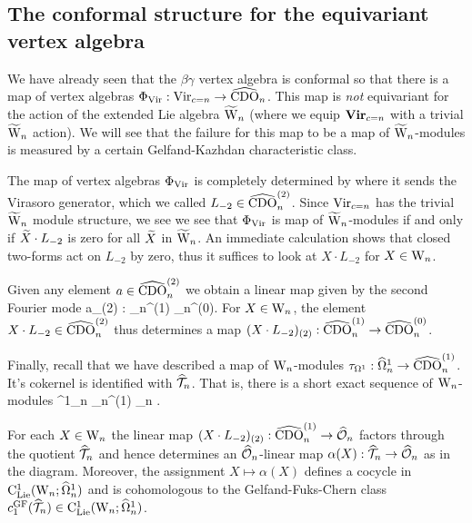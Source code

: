 \subsection{The conformal structure for the equivariant vertex algebra}

We have already seen that the $\beta\gamma$ vertex algebra is
conformal so that there is a map of vertex algebras $\Phi_{\rm Vir} :
{\rm Vir}_{c=n} \to \hCDO_n$. This map is {\em not} equivariant for
the action of the extended Lie algebra $\TVect$ (where we equip ${\bf
  Vir}_{c=n}$ with a trivial $\TVect$ action). We will see that the
failure for this map to be a map of $\TVect$-modules is measured by a
certain Gelfand-Kazhdan characteristic class. 

The map of vertex algebras $\Phi_{\rm Vir}$ is completely determined
by where it sends the Virasoro generator, which we called $L_{-2} \in
\hCDO_n^{(2)}$. Since ${\rm Vir}_{c=n}$ has the trivial $\TVect$
module structure, we see we see that $\Phi_{\rm Vir}$ is map of $\TVect$-modules if and only if $\Tilde{X} \cdot L_{-2}$ is zero for all $\Tilde{X}$ in $\TVect$. An immediate calculation shows that closed two-forms act on $L_{-2}$ by zero, thus it suffices to look at $X \cdot L_{-2}$ for $X \in \Vect$. 

Given any element $a \in \hCDO_n^{(2)}$ we obtain a linear map given
by the second Fourier mode
\ben
a_{(2)} : \hCDO_n^{(1)} \to \hCDO_n^{(0)}. 
\een 
For $X \in \Vect$, the element $X \cdot L_{-2} \in \hCDO_n^{(2)}$ thus determines a map $(X \cdot L_{-2})_{(2)} : \hCDO_n^{(1)} \to \hCDO_n^{(0)}$. 

Finally, recall that we have described a map of $\Vect$-modules $\tau_{\Omega^1} : \hOmega^1_n \to \hCDO_n^{(1)}$. It's cokernel is identified with $\hT_n$. That is, there is a short exact sequence of $\Vect$-modules
 \to \hOmega^1_n \to \hCDO_n^{(1)} \to \hT_n  .
\een 

\begin{prop}\label{prop c1 conformal} For each $X \in \Vect$ the linear map $(X \cdot L_{-2})_{(2)} : \hCDO_n^{(1)} \to \hO_n$ factors through the quotient $\hT_n$ 
\ben
{}
\een 
and hence determines an $\hO_n$-linear map $\alpha(X) : \hT_n \to \hO_n$ as in the diagram. Moreover, the assignment $X \mapsto \alpha({X})$ defines a cocycle in $\clie^1(\Vect ; \hOmega^1_n)$ and is cohomologous to the Gelfand-Fuks-Chern class $c^\GF_1(\hT_n) \in \clie^1(\Vect ; \hOmega^1_n)$. 
\end{prop}

